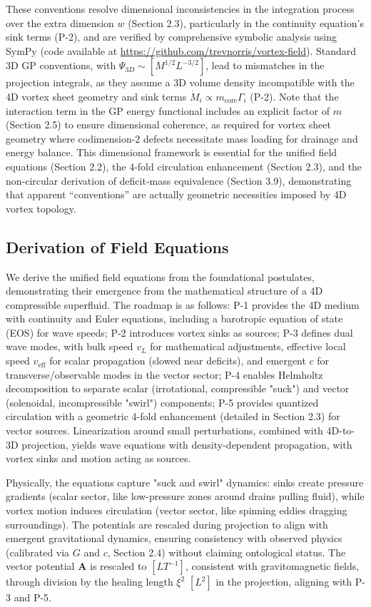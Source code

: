 These conventions resolve dimensional inconsistencies in the integration process over the extra dimension $w$ (Section 2.3), particularly in the continuity equation's sink terms (P-2), and are verified by comprehensive symbolic analysis using SymPy (code available at \url{https://github.com/trevnorris/vortex-field}). Standard 3D GP conventions, with $\Psi_{3D} \sim [M^{1/2} L^{-3/2}]$, lead to mismatches in the projection integrals, as they assume a 3D volume density incompatible with the 4D vortex sheet geometry and sink terms $\dot{M}_i \propto m_{\text{core}} \Gamma_i$ (P-2). Note that the interaction term in the GP energy functional includes an explicit factor of $m$ (Section 2.5) to ensure dimensional coherence, as required for vortex sheet geometry where codimension-2 defects necessitate mass loading for drainage and energy balance. This dimensional framework is essential for the unified field equations (Section 2.2), the 4-fold circulation enhancement (Section 2.3), and the non-circular derivation of deficit-mass equivalence (Section 3.9), demonstrating that apparent ``conventions'' are actually geometric necessities imposed by 4D vortex topology.

\subsection{Derivation of Field Equations}

We derive the unified field equations from the foundational postulates, demonstrating their emergence from the mathematical structure of a 4D compressible superfluid. The roadmap is as follows: P-1 provides the 4D medium with continuity and Euler equations, including a barotropic equation of state (EOS) for wave speeds; P-2 introduces vortex sinks as sources; P-3 defines dual wave modes, with bulk speed $v_L$ for mathematical adjustments, effective local speed $v_{\text{eff}}$ for scalar propagation (slowed near deficits), and emergent $c$ for transverse/observable modes in the vector sector; P-4 enables Helmholtz decomposition to separate scalar (irrotational, compressible "suck") and vector (solenoidal, incompressible "swirl") components; P-5 provides quantized circulation with a geometric 4-fold enhancement (detailed in Section 2.3) for vector sources. Linearization around small perturbations, combined with 4D-to-3D projection, yields wave equations with density-dependent propagation, with vortex sinks and motion acting as sources.

Physically, the equations capture "suck and swirl" dynamics: sinks create pressure gradients (scalar sector, like low-pressure zones around drains pulling fluid), while vortex motion induces circulation (vector sector, like spinning eddies dragging surroundings). The potentials are rescaled during projection to align with emergent gravitational dynamics, ensuring consistency with observed physics (calibrated via $G$ and $c$, Section 2.4) without claiming ontological status. The vector potential $\mathbf{A}$ is rescaled to $[L T^{-1}]$, consistent with gravitomagnetic fields, through division by the healing length $\xi^2$ $[L^2]$ in the projection, aligning with P-3 and P-5.

